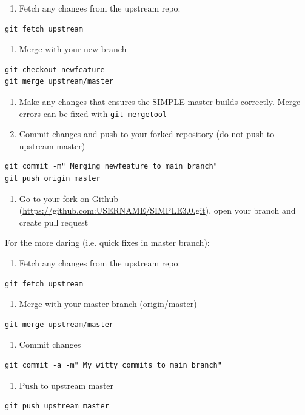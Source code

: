 \documentclass[a4paper,11pt]{article}
\begin{document}
\begin{enumerate}
\item Fetch any changes from the upstream repo:
\end{enumerate}
\begin{verbatim}
git fetch upstream
\end{verbatim}
\begin{enumerate}
\item Merge with your new branch
\end{enumerate}
\begin{verbatim}
git checkout newfeature
git merge upstream/master
\end{verbatim}

\begin{enumerate}
\item Make any changes that ensures the SIMPLE master builds correctly. Merge errors can be fixed with \texttt{git mergetool}

\item Commit changes and push to your forked repository (do not push to upstream master)
\end{enumerate}
\begin{verbatim}
git commit -m" Merging newfeature to main branch"
git push origin master
\end{verbatim}

\begin{enumerate}
\item Go to your fork on Github (\url{https://github.com:USERNAME/SIMPLE3.0.git}), open your branch and create pull request
\end{enumerate}


For the more daring (i.e. quick fixes in master branch):
\begin{enumerate}
\item Fetch any changes from the upstream repo:
\end{enumerate}
\begin{verbatim}
git fetch upstream
\end{verbatim}
\begin{enumerate}
\item Merge with your master branch (origin/master)
\end{enumerate}
\begin{verbatim}
git merge upstream/master
\end{verbatim}
\begin{enumerate}
\item Commit changes
\end{enumerate}
\begin{verbatim}
git commit -a -m" My witty commits to main branch"
\end{verbatim}
\begin{enumerate}
\item Push to upstream master
\end{enumerate}
\begin{verbatim}
git push upstream master
\end{verbatim}

\def\bibfont{\footnotesize}


\end{document}
